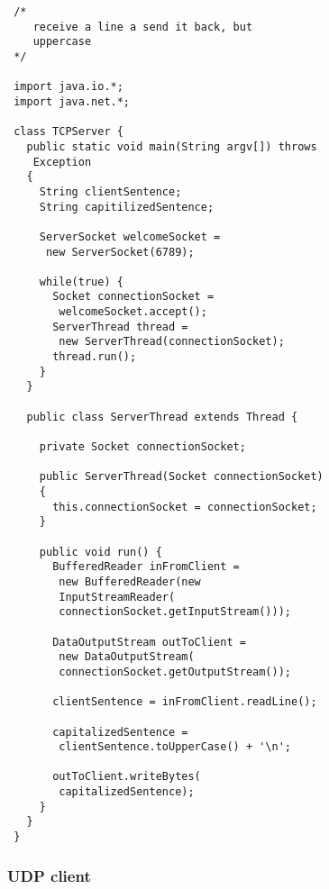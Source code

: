 \documentclass[10pt, a4paper, twocolumn]{scrartcl}
\begin{document}
\begin{verbatim}
 /*
    receive a line a send it back, but 
    uppercase
 */

 import java.io.*;
 import java.net.*;

 class TCPServer {
   public static void main(String argv[]) throws
    Exception
   {
     String clientSentence;
     String capitilizedSentence;

     ServerSocket welcomeSocket =
      new ServerSocket(6789);

     while(true) {
       Socket connectionSocket = 
        welcomeSocket.accept();
       ServerThread thread =
        new ServerThread(connectionSocket);
       thread.run();
     }
   }

   public class ServerThread extends Thread {
     
     private Socket connectionSocket;

     public ServerThread(Socket connectionSocket)
     {
       this.connectionSocket = connectionSocket;
     }
       
     public void run() {
       BufferedReader inFromClient =
        new BufferedReader(new
        InputStreamReader(
        connectionSocket.getInputStream()));

       DataOutputStream outToClient =
        new DataOutputStream(
        connectionSocket.getOutputStream());

       clientSentence = inFromClient.readLine();
       
       capitalizedSentence =
        clientSentence.toUpperCase() + '\n';

       outToClient.writeBytes(
        capitalizedSentence);
     }
   }
 }
\end{verbatim}

\subsubsection{UDP client}
\end{document}
